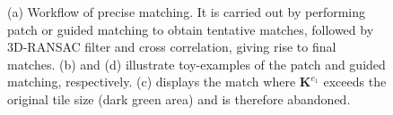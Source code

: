 \begin{figure}[htbp]
	\begin{center}
		\caption{(a) Workflow of precise matching. It is carried out by performing patch or guided matching to obtain tentative matches, followed by 3D-RANSAC filter and cross correlation, giving rise to final matches. (b) and (d) illustrate toy-examples of the patch and guided matching, respectively. (c) displays the match where $\mathbf{K}^{e_1}$ exceeds the original tile size (dark green area) and is therefore abandoned.}
		\label{WorkflowPatch}
	\end{center}
\end{figure}

